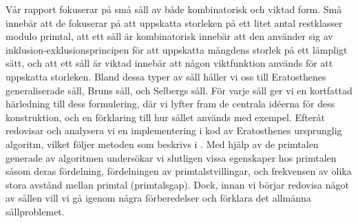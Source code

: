 Vår rapport fokuserar på små såll av både kombinatorisk och viktad form. 
Små innebär att de fokuserar på att uppskatta storleken på ett litet antal restklasser modulo primtal, att ett såll är kombinatorisk innebär att den använder sig av inklusion-exklusionsprincipen för att uppskatta mängdens storlek på ett lämpligt sätt, och att ett såll är viktad innebär att någon viktfunktion används för att uppskatta storleken. 
Bland dessa typer av såll håller vi oss till Eratosthenes generaliserade såll, Bruns såll, och Selbergs såll. 
För varje såll ger vi en kortfattad härledning till dess formulering, där vi lyfter fram de centrala idéerna för dess konstruktion, och en förklaring till hur sållet används med exempel. 
Efteråt redovisar och analysera vi en implementering i kod av Eratosthenes ursprunglig algoritm, vilket följer metoden som beskrivs i \cite{HaraldSieve}.
Med hjälp av de primtalen generade av algoritmen undersökar vi slutligen vissa egenskaper hos primtalen såsom deras fördelning, fördelningen av primtalstvillingar, och frekvensen av olika stora avstånd mellan primtal (primtalsgap).
Dock, innan vi börjar redovisa något av sållen vill vi gå igenom några förberedelser och förklara det allmänna sållproblemet.